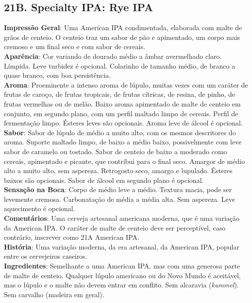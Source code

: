 \subsection*{21B. Specialty IPA: Rye IPA}
\textbf{Impressão Geral}: Uma American IPA condimentada, elaborada com malte de grãos de centeio. O centeio traz um sabor de pão e apimentado, um corpo mais cremoso e um final seco e com sabor de cereais. \\
\textbf{Aparência}: Cor variando de dourado médio a âmbar avermelhado claro. Límpida. Leve turbidez é opcional. Colarinho de tamanho médio, de branco a quase branco, com boa persistência. \\
\textbf{Aroma}: Proeminente a intenso aroma de lúpulo, muitas vezes com um caráter de frutas de caroço, de frutas tropicais, de frutas cítricas, de resina, de pinho, de frutas vermelhas ou de melão. Baixo aroma apimentado de malte de centeio em conjunto, em segundo plano, com um perfil maltado limpo de cereais. Perfil de fermentação limpo. Ésteres leves são opcionais. Aroma leve de álcool é opcional. \\
\textbf{Sabor}: Sabor de lúpulo de médio a muito alto, com os mesmos descritores do aroma. Suporte maltado limpo, de baixo a médio baixo, possivelmente com leve sabor de caramelo ou tostado. Sabor de centeio de baixo a moderado como cereais, apimentado e picante, que contribui para o final seco. Amargor de médio alto a muito alto, sem aspereza. Retrogosto seco, amargo e lupulado. Ésteres baixos são opcionais. Sabor de álcool em segundo plano é opcional. \\
\textbf{Sensação na Boca}: Corpo de médio leve a médio. Textura macia, pode ser levemente cremosa. Carbonatação de média a média alta. Sem aspereza. Leve aquecimento é opcional. \\
\textbf{Comentários}: Uma cerveja artesanal americana moderna, que é uma variação da American IPA. O caráter de malte de centeio deve ser perceptível, caso contrário, inscrever como 21A American IPA. \\
\textbf{História}: Uma variação moderna, da era artesanal, da American IPA, popular entre os cervejeiros caseiros. \\
\textbf{Ingredientes}: Semelhante a uma American IPA, mas com uma generosa parte de malte de centeio. Qualquer lúpulo americano ou do Novo Mundo é aceitável, mas o lúpulo e o malte não devem entrar em conflito. Sem alcaravia (\textit{kummel}). Sem carvalho (madeira em geral). \\
